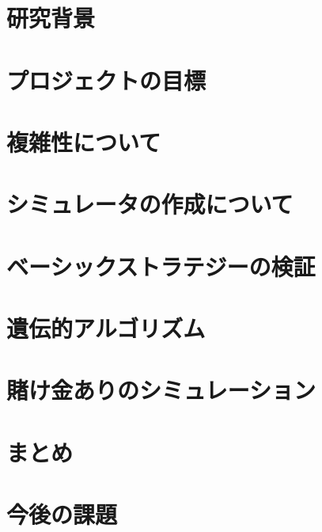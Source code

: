 \documentclass[11pt,a4paper,oneside]{jsbook}
\begin{document}
\tableofcontents
\newpage

\mainmatter

\chapter{研究背景}






\chapter{プロジェクトの目標}

\chapter{複雑性について}


\chapter{シミュレータの作成について}


\chapter{ベーシックストラテジーの検証}




\chapter{遺伝的アルゴリズム}



\chapter{賭け金ありのシミュレーション}



\chapter{まとめ}

\chapter{今後の課題}

\end{document}
